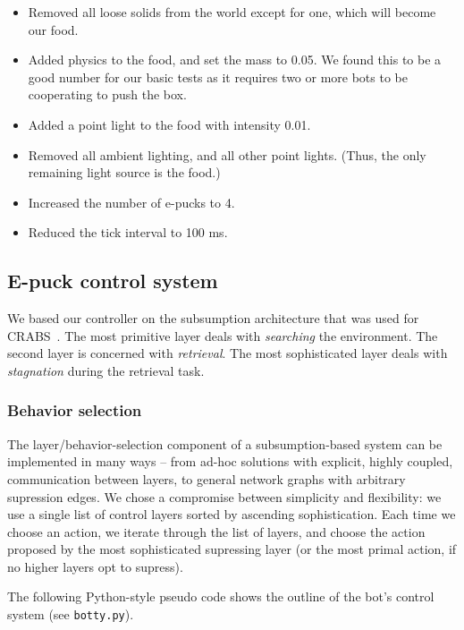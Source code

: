\documentclass[a4paper,10pt]{article}
\newcommand{\numbots}{4}
\newcommand{\foodmass}{0.05}
\newcommand{\lightintensity}{0.01}
\newcommand{\tickinterval}{100 ms}
\begin{document}
\begin{itemize}
    \item Removed all loose solids from the world except for one, which will
    become our food.
    \item Added physics to the food, and set the mass to \foodmass.
    We found this to be a good number for our basic tests as it
    requires two or more bots to be cooperating to push the box.
    \item Added a point light to the food with intensity \lightintensity.
    \item Removed all ambient lighting, and all other point lights. (Thus, the
    only remaining light source is the food.)
    \item Increased the number of e-pucks to \numbots.
    \item Reduced the tick interval to \tickinterval.
\end{itemize}


\subsection{E-puck control system}
\label{sec:a2}

We based our controller on the subsumption architecture that was used for
CRABS~\cite{berg2011}. The most primitive layer deals with \emph{searching}
the environment. The second layer is concerned with \emph{retrieval}. The most
sophisticated layer deals with \emph{stagnation} during the retrieval task.

\subsubsection{Behavior selection}
The layer/behavior-selection component of a subsumption-based system can be
implemented in many ways -- from ad-hoc solutions with explicit, highly
coupled, communication between layers, to general network graphs with
arbitrary supression edges. We chose a compromise between simplicity and
flexibility: we use a single list of control layers sorted by ascending
sophistication. Each time we choose an action, we iterate through the list of
layers, and choose the action proposed by the most sophisticated supressing
layer (or the most primal action, if no higher layers opt to supress). 

The following Python-style pseudo code shows the outline of the
bot's control system (see \texttt{botty.py}).
\end{document}
